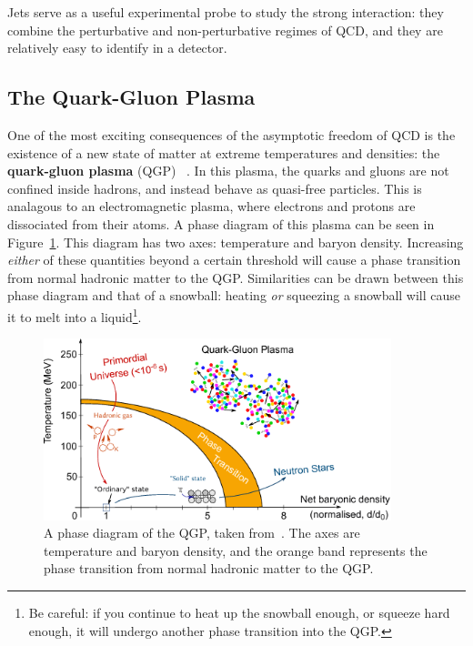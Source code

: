Jets serve as a useful experimental probe to study the strong interaction: they combine the perturbative and non-perturbative regimes of QCD, and they are relatively easy to identify in a detector.

\subsection{The Quark-Gluon Plasma}
\label{sec:qgp}

One of the most exciting consequences of the asymptotic freedom of QCD is the existence of a new state of matter at extreme temperatures and densities: the \textbf{quark-gluon plasma} (QGP) ~\cite{QGP1, QGP2}. In this plasma, the quarks and gluons are not confined inside hadrons, and instead behave as quasi-free particles. This is analagous to an electromagnetic plasma, where electrons and protons are dissociated from their atoms. A phase diagram of this plasma can be seen in Figure~\ref{fig:qgp_phase_diagram}. This diagram has two axes: temperature and baryon density. Increasing \textit{either} of these quantities beyond a certain threshold will cause a phase transition from normal hadronic matter to the QGP. Similarities can be drawn between this phase diagram and that of a snowball: heating \textit{{or}} squeezing a snowball will cause it to melt into a liquid\footnote{Be careful: if you continue to heat up the snowball enough, or squeeze hard enough, it will undergo another phase transition into the QGP.}.

\begin{figure}
    \centering
    \includegraphics[width=0.9\textwidth]{figures/introduction/qgp_phase_diagram.png}
    \caption{A phase diagram of the QGP, taken from~\cite{QGPPhaseDiagram}. The axes are temperature and baryon density, and the orange band represents the phase transition from normal hadronic matter to the QGP.}
    \label{fig:qgp_phase_diagram}
\end{figure}

